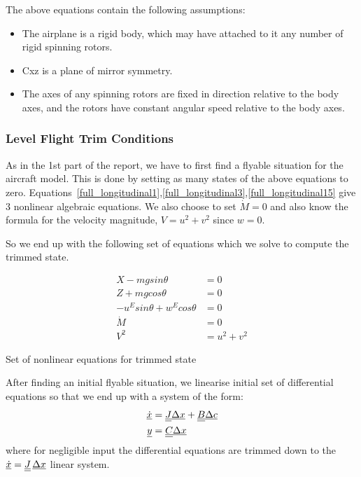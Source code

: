 The above equations contain the following assumptions:
\begin{itemize}
\item The airplane is a rigid body, which may have attached to it any number of
rigid spinning rotors.
\item Cxz is a plane of mirror symmetry.
\item The axes of any spinning rotors are fixed in direction relative to the body
axes, and the rotors have constant angular speed relative to the body axes.
\end{itemize}

\subsubsection{Level Flight Trim Conditions}
As in the 1st part of the report, we have to first find a flyable situation for
the aircraft model. This is done by setting as many states of the above
equations to zero.
Equations~\ref{full_longitudinal1},\ref{full_longitudinal3},\ref{full_longitudinal15}
give 3 nonlinear algebraic equations. We also choose to set $\dot{M} = 0$ and
also know the formula for the velocity magnitude, $V = u^2 + v^2$ since $w = 0$.

So we end up with the following set of equations which we solve to compute the
trimmed state.

\begin{align}
    X - mgsin\theta &= 0\\
    Z + mgcos\theta &= 0\\
    -u^Esin\theta +  w^Ecos\theta &= 0\\
    \dot{M} &= 0\\
    V^2 &= u^2 + v^2
\end{align}
\begin{center}Set of nonlinear equations for trimmed state\end{center}

After finding an initial flyable situation, we linearise initial set of 
differential equations so that we end up with a system of the form:
\begin{align*}
    \underline{\dot{x}} &= \underline{\underline{J}}\underline{\Delta x} +
    \underline{\underline{B}}\underline{\Delta c}\\
    \underline{y} &= \underline{\underline{C}}\underline{\Delta x}
\end{align*}
where for negligible input the differential equations are trimmed down to the 
$\underline{\dot{x}} = \underline{\underline{J}}\,\underline{\Delta x}$ linear system.

